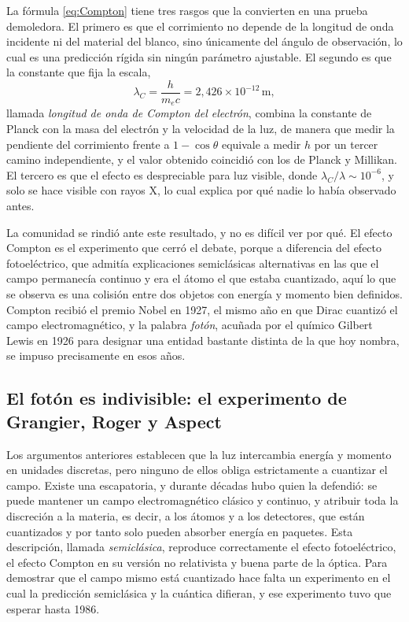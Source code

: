             La fórmula \eqref{eq:Compton} tiene tres rasgos que la convierten en una prueba demoledora. El primero es que el corrimiento no depende de la longitud de onda incidente ni del material del blanco, sino únicamente del ángulo de observación, lo cual es una predicción rígida sin ningún parámetro ajustable. El segundo es que la constante que fija la escala,
            \begin{equation}\label{eq:LongitudCompton}
                \lambda_{C} = \frac{h}{m_{e}c} = 2{,}426\times 10^{-12}\,\mathrm{m},
            \end{equation}
            llamada \textit{longitud de onda de Compton del electrón}, combina la constante de Planck con la masa del electrón y la velocidad de la luz, de manera que medir la pendiente del corrimiento frente a $1-\cos\theta$ equivale a medir $h$ por un tercer camino independiente, y el valor obtenido coincidió con los de Planck y Millikan. El tercero es que el efecto es despreciable para luz visible, donde $\lambda_{C}/\lambda \sim 10^{-6}$, y solo se hace visible con rayos X, lo cual explica por qué nadie lo había observado antes.

            La comunidad se rindió ante este resultado, y no es difícil ver por qué. El efecto Compton es el experimento que cerró el debate, porque a diferencia del efecto fotoeléctrico, que admitía explicaciones semiclásicas alternativas en las que el campo permanecía continuo y era el átomo el que estaba cuantizado, aquí lo que se observa es una colisión entre dos objetos con energía y momento bien definidos. Compton recibió el premio Nobel en 1927, el mismo año en que Dirac cuantizó el campo electromagnético, y la palabra \textit{fotón}, acuñada por el químico Gilbert Lewis en 1926 para designar una entidad bastante distinta de la que hoy nombra, se impuso precisamente en esos años.

    \subsection{El fotón es indivisible: el experimento de Grangier, Roger y Aspect}

        Los argumentos anteriores establecen que la luz intercambia energía y momento en unidades discretas, pero ninguno de ellos obliga estrictamente a cuantizar el campo. Existe una escapatoria, y durante décadas hubo quien la defendió: se puede mantener un campo electromagnético clásico y continuo, y atribuir toda la discreción a la materia, es decir, a los átomos y a los detectores, que están cuantizados y por tanto solo pueden absorber energía en paquetes. Esta descripción, llamada \textit{semiclásica}, reproduce correctamente el efecto fotoeléctrico, el efecto Compton en su versión no relativista y buena parte de la óptica. Para demostrar que el campo mismo está cuantizado hace falta un experimento en el cual la predicción semiclásica y la cuántica difieran, y ese experimento tuvo que esperar hasta 1986.

